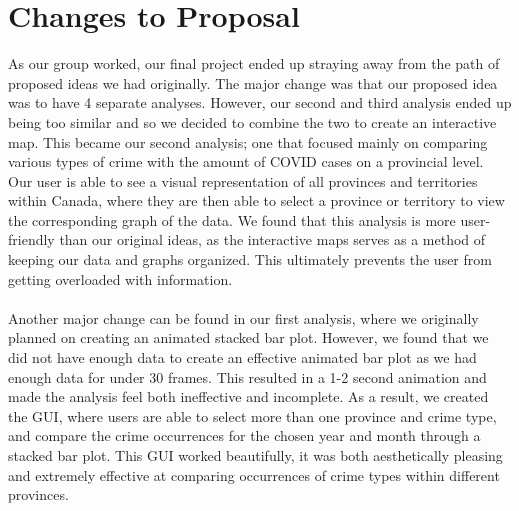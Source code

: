 \documentclass[fontsize=11pt]{article}
\begin{document}
\section*{Changes to Proposal}

As our group worked, our final project ended up straying away from the path of proposed ideas we had originally. The major change was that our proposed idea was to have 4 separate analyses. However, our second and third analysis ended up being too similar and so we decided to combine the two to create an interactive map. This became our second analysis; one that focused mainly on comparing various types of crime with the amount of COVID cases on a provincial level. Our user is able to see a visual representation of all provinces and territories within Canada, where they are then able to select a province or territory to view the corresponding graph of the data. We found that this analysis is more user-friendly than our original ideas, as the interactive maps serves as a method of keeping our data and graphs organized. This ultimately prevents the user from getting overloaded with information. 
\\
\\
Another major change can be found in our first analysis, where we originally planned on creating an animated stacked bar plot. However, we found that we did not have enough data to create an effective animated bar plot as we had enough data for under 30 frames. This resulted in a 1-2 second animation and made the analysis feel both ineffective and incomplete. As a result, we created the GUI, where users are able to select more than one province and crime type, and compare the crime occurrences for the chosen year and month through a stacked bar plot. This GUI worked beautifully, it was both aesthetically pleasing and extremely effective at comparing occurrences of crime types within different provinces. 
\end{document}
